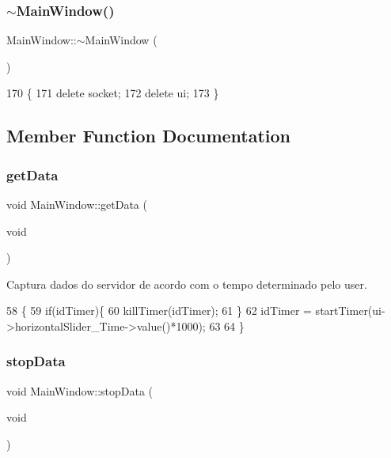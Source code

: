 \subsubsection{\texorpdfstring{$\sim$\+Main\+Window()}{~MainWindow()}}
{\footnotesize\ttfamily Main\+Window\+::$\sim$\+Main\+Window (\begin{DoxyParamCaption}{ }\end{DoxyParamCaption})}


\begin{DoxyCode}
170 \{
171     \textcolor{keyword}{delete} socket;
172     \textcolor{keyword}{delete} ui;
173 \}
\end{DoxyCode}


\subsection{Member Function Documentation}
\mbox{\label{class_main_window_ac6d3a5fa8ef8ede69436b9e9a6ee80c1}} 
\subsubsection{\texorpdfstring{get\+Data}{getData}}
{\footnotesize\ttfamily void Main\+Window\+::get\+Data (\begin{DoxyParamCaption}\item[{void}]{ }\end{DoxyParamCaption})\hspace{0.3cm}{\ttfamily [slot]}}



Captura dados do servidor de acordo com o tempo determinado pelo user. 


\begin{DoxyCode}
58                         \{
59     \textcolor{keywordflow}{if}(idTimer)\{
60         killTimer(idTimer);
61     \}
62     idTimer = startTimer(ui->horizontalSlider\_Time->value()*1000);
63 
64 \}
\end{DoxyCode}
\mbox{\label{class_main_window_a2e3dceeb08f18cc1d07e42b79fe7a0c1}} 
\subsubsection{\texorpdfstring{stop\+Data}{stopData}}
{\footnotesize\ttfamily void Main\+Window\+::stop\+Data (\begin{DoxyParamCaption}\item[{void}]{ }\end{DoxyParamCaption})\hspace{0.3cm}{\ttfamily [slot]}}



